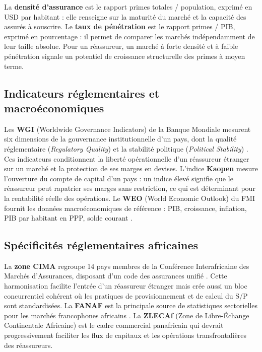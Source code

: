 \documentclass[../main.tex]{subfiles}
\begin{document}
La \textbf{densité d'assurance} est le rapport primes totales / population, exprimé
en USD par habitant : elle renseigne sur la maturité du marché et la capacité des
assurés à souscrire. Le \textbf{taux de pénétration} est le rapport primes / PIB,
exprimé en pourcentage : il permet de comparer les marchés indépendamment de leur
taille absolue. Pour un réassureur, un marché à forte densité et à faible pénétration
signale un potentiel de croissance structurelle des primes à moyen terme.

\subsection{Indicateurs réglementaires et macroéconomiques}

Les \textbf{WGI} (Worldwide Governance Indicators) de la Banque Mondiale mesurent
six dimensions de la gouvernance institutionnelle d'un pays, dont la qualité
réglementaire (\textit{Regulatory Quality}) et la stabilité politique (\textit{Political
Stability}) \citep{BanqueMondiale2023}. Ces indicateurs conditionnent la liberté
opérationnelle d'un réassureur étranger sur un marché et la protection de ses marges
en devises. L'indice \textbf{Kaopen} \citep{ChinnIto2006} mesure l'ouverture du compte
de capital d'un pays : un indice élevé signifie que le réassureur peut rapatrier ses
marges sans restriction, ce qui est déterminant pour la rentabilité réelle des
opérations. Le \textbf{WEO} (World Economic Outlook) du FMI fournit les données
macroéconomiques de référence : PIB, croissance, inflation, PIB par habitant en PPP,
solde courant \citep{FMI2024}.

\subsection{Spécificités réglementaires africaines}

La \textbf{zone CIMA} regroupe 14 pays membres de la Conférence Interafricaine des
Marchés d'Assurances, disposant d'un code des assurances unifié \citep{CIMA2023}.
Cette harmonisation facilite l'entrée d'un réassureur étranger mais crée aussi un
bloc concurrentiel cohérent où les pratiques de provisionnement et de calcul du S/P
sont standardisées. La \textbf{FANAF} est la principale source de statistiques
sectorielles pour les marchés francophones africains \citep{FANAF2023}. La
\textbf{ZLECAf} (Zone de Libre-Échange Continentale Africaine) est le cadre
commercial panafricain qui devrait progressivement faciliter les flux de capitaux
et les opérations transfrontalières des réassureurs.
\end{document}
